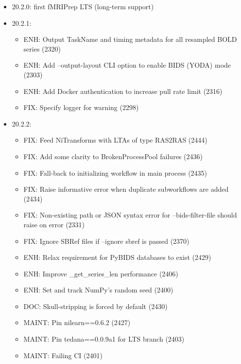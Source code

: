 \documentclass{article}
\begin{document}
\begin{appendices}
    \begin{itemize}
        \item 20.2.0: first fMRIPrep LTS (long-term support)
        \item 20.2.1:
              \begin{itemize}
                  \item ENH: Output TaskName and timing metadata for all resampled BOLD series (2320)
                  \item ENH: Add --output-layout CLI option to enable BIDS (YODA) mode (2303)
                  \item ENH: Add Docker authentication to increase pull rate limit (2316)
                  \item FIX: Specify logger for warning (2298)
              \end{itemize}
        \item 20.2.2:
              \begin{itemize}
                  \item FIX: Feed NiTransforms with LTAs of type RAS2RAS (2444)
                  \item FIX: Add some clarity to BrokenProcessPool failures (2436)
                  \item FIX: Fall-back to initializing workflow in main process (2435)
                  \item FIX: Raise informative error when duplicate subworkflows are added (2434)
                  \item FIX: Non-existing path or JSON syntax error for --bids-filter-file should raise on error (2331)
                  \item FIX: Ignore SBRef files if --ignore sbref is passed (2370)
                  \item ENH: Relax requirement for PyBIDS databases to exist (2429)
                  \item ENH: Improve \_get\_series\_len performance (2406)
                  \item ENH: Set and track NumPy's random seed (2400)
                  \item DOC: Skull-stripping is forced by default (2430)
                  \item MAINT: Pin nilearn==0.6.2 (2427)
                  \item MAINT: Pin tedana==0.0.9a1 for LTS branch (2403)
                  \item MAINT: Failing CI (2401)
              \end{itemize}

\end{itemize}
\end{appendices}
\end{document}

